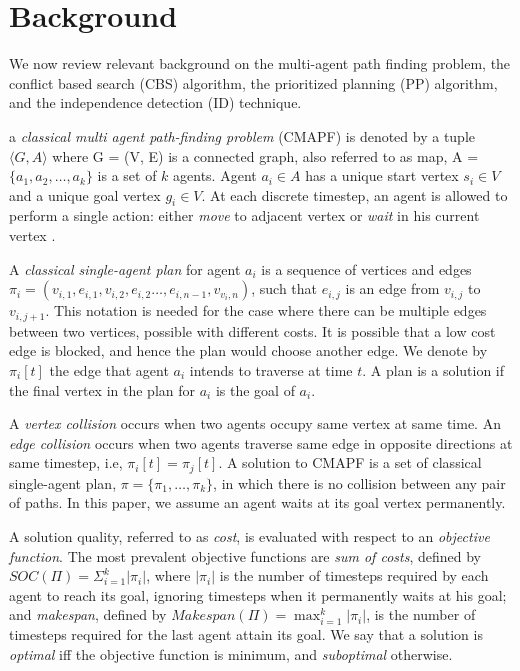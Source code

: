 \documentclass[letterpaper]{article} %
\def\
UrlFont{\rm}  %
\newcommand{\plan}[1]{\textbf{[\color{blue}PLAN:#1]}}
\theoremstyle{definition}
\begin{document}





\section{Background}

We now review relevant background on the multi-agent path finding problem, the conflict based search (CBS) algorithm, the prioritized planning (PP) algorithm, and the independence detection (ID) technique.

a \emph{classical multi agent path-finding problem} (CMAPF) is denoted by a tuple $\langle G, A \rangle$ where G = (V, E) is a connected graph, also referred to as map, A = $\{a_1, a_2, \ldots, a_k\}$ is a set of $k$ agents. Agent $a_i\in A$ has a unique start vertex $s_i \in V$ and a unique goal vertex $g_i \in V$. At each discrete timestep, an agent is allowed to perform a single action: either \emph{move} to adjacent vertex or \emph{wait} in his current vertex \cite{stern2019overiew}. 

A \emph{classical single-agent plan} for agent $a_i$ is a sequence of vertices and edges $\pi_{i} = (v_{i,1}, e_{i,1}, v_{i,2},  e_{i,2} \ldots,  e_{i,n-1}, v_{v_i,n})$, such that $e_{i,j}$ is an edge from $v_{i,j}$ to $v_{i,j+1}$. This notation is needed for the case where there can be multiple edges between two vertices, possible with different costs. It is possible that a low cost edge is blocked, and hence the plan would choose another edge. We denote by $\pi_{i}[t]$ the edge that agent $a_{i}$ intends to traverse at time $t$. A plan is a solution if the final vertex in the plan for $a_i$ is the goal of $a_i$.

A \emph{vertex collision} occurs when two agents occupy same vertex at same time. An \emph{edge collision} occurs when two agents traverse same edge in opposite directions at same timestep, i.e, $\pi_{i}[t] = \pi_{j}[t]$. A solution to CMAPF is a set of classical single-agent plan, $\pi=\{\pi_1,\ldots,\pi_k\}$, in which there is no collision between any pair of paths. In this paper, we assume an agent waits at its goal vertex permanently. 

A solution quality, referred to as \emph{cost}, is evaluated with respect to an \emph{objective function}. The most prevalent objective functions are \emph{sum of costs}, defined by $ SOC(\Pi)=\Sigma_{i=1}^{k} |\pi_{i}| $, where $|\pi_{i}|$ is the number of timesteps required by each agent to reach its goal, ignoring timesteps when it permanently waits at his goal; and \emph{makespan}, defined by $Makespan(\Pi)=\max_{i=1}^{k}|\pi_{i}|$, is the number of timesteps required for the last agent attain its goal. We say that a solution is \emph{optimal} iff the objective function is minimum, and \emph{suboptimal} otherwise.
\end{document}
